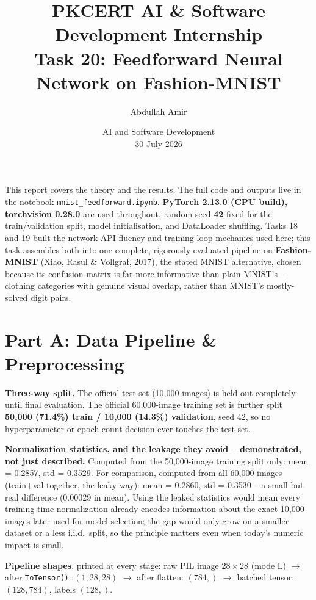 \documentclass[11pt,a4paper]{article}
\title{\vspace{-1.5cm}\textbf{PKCERT AI \& Software Development Internship \\ Task 20: Feedforward Neural Network on Fashion-MNIST}}
\author{Abdullah Amir}
\date{AI and Software Development \\ 30 July 2026}
\begin{document}
\maketitle
\vspace{-0.8cm}

This report covers the theory and the results. The full code and outputs live in the
notebook \texttt{mnist\_feedforward.ipynb}. \textbf{PyTorch 2.13.0 (CPU build),
torchvision 0.28.0} are used throughout, random seed \textbf{42} fixed for the
train/validation split, model initialisation, and DataLoader shuffling. Tasks 18 and 19
built the network API fluency and training-loop mechanics used here; this task
assembles both into one complete, rigorously evaluated pipeline on
\textbf{Fashion-MNIST} (Xiao, Rasul \& Vollgraf, 2017), the stated MNIST alternative,
chosen because its confusion matrix is far more informative than plain MNIST's --
clothing categories with genuine visual overlap, rather than MNIST's mostly-solved
digit pairs.

\section*{Part A: Data Pipeline \& Preprocessing}

\textbf{Three-way split.} The official test set (10,000 images) is held out completely
until final evaluation. The official 60,000-image training set is further split
\textbf{50,000 (71.4\%) train / 10,000 (14.3\%) validation}, seed 42, so no
hyperparameter or epoch-count decision ever touches the test set.

\textbf{Normalization statistics, and the leakage they avoid -- demonstrated, not just
described.} Computed from the 50,000-image training split only: mean = 0.2857,
std = 0.3529. For comparison, computed from all 60,000 images (train+val together, the
leaky way): mean = 0.2860, std = 0.3530 -- a small but real difference (0.00029 in
mean). Using the leaked statistics would mean every training-time normalization already
encodes information about the exact 10,000 images later used for model selection; the
gap would only grow on a smaller dataset or a less i.i.d.\ split, so the principle
matters even when today's numeric impact is small.

\textbf{Pipeline shapes}, printed at every stage: raw PIL image $28\times28$ (mode L)
$\to$ after \texttt{ToTensor()}: $(1, 28, 28)$ $\to$ after flatten: $(784,)$ $\to$
batched tensor: $(128, 784)$, labels $(128,)$.
\end{document}

